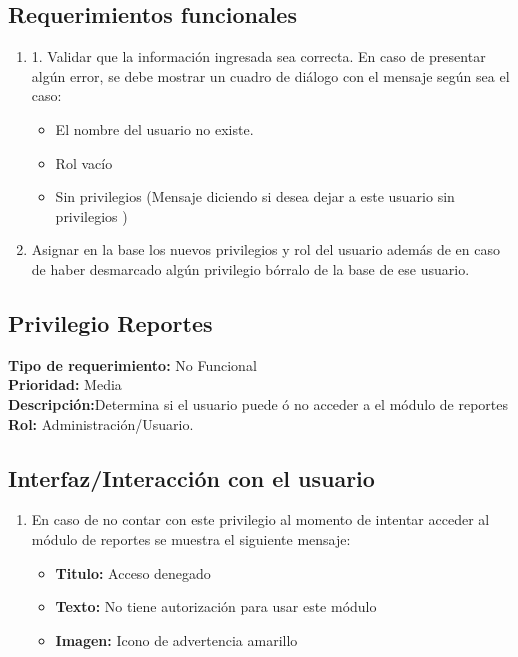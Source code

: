 \documentclass[a4paper,DIV=12]{scrreprt}
\begin{document}
\subsection*{Requerimientos funcionales}
\begin{enumerate}
	\item{1.	Validar que la información ingresada sea correcta.
 En caso de presentar algún error, se debe mostrar un cuadro de diálogo con el mensaje según sea el caso: 
}
	\begin{itemize}
		\item{El nombre del usuario no existe.}
		\item{Rol vacío }
		\item{Sin privilegios (Mensaje diciendo si desea dejar a este usuario sin privilegios )}				
	\end{itemize}
	
	\item{Asignar en la base los nuevos privilegios y rol del usuario además de en caso de haber desmarcado algún privilegio bórralo de la base de ese usuario. }
		
\end{enumerate}

\newpage
\setcounter{section}{1}
\setcounter{subsection}{0}
\subsection{Privilegio Reportes}
\noindent
\textbf{Tipo de requerimiento:} No Funcional\\
\textbf{Prioridad:} Media\\
\textbf{Descripción:}Determina si el usuario puede ó no acceder a el módulo de reportes\\
\textbf{Rol:} Administración/Usuario.
\subsection*{Interfaz/Interacción con el usuario}
\begin{enumerate}
	\item{En caso de no contar con este privilegio al momento de intentar acceder al módulo de reportes se muestra el siguiente mensaje:}
	\begin{itemize}
		\item{\textbf{Titulo:} Acceso denegado}
		\item{\textbf{Texto:} No tiene autorización para usar este módulo}
		\item{\textbf{Imagen:} Icono de advertencia amarillo}
	\end{itemize}
\end{enumerate}
\end{document}
